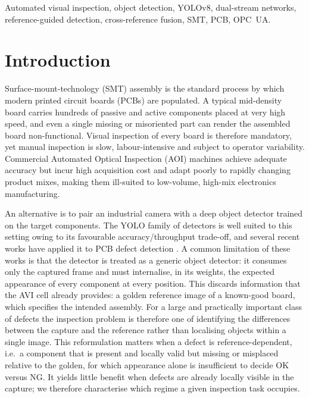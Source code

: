 \documentclass[conference]{IEEEtran}
\begin{document}
\begin{IEEEkeywords}
Automated visual inspection, object detection, YOLOv8, dual-stream
networks, reference-guided detection, cross-reference fusion, SMT,
PCB, OPC~UA.
\end{IEEEkeywords}

\section{Introduction}
\label{sec:intro}

Surface-mount-technology (SMT) assembly is the standard process by which
modern printed circuit boards (PCBs) are populated. A typical mid-density
board carries hundreds of passive and active components placed at very high
speed, and even a single missing or misoriented part can render the assembled
board non-functional. Visual inspection of every board is therefore mandatory,
yet manual inspection is slow, labour-intensive and subject to operator
variability. Commercial Automated Optical Inspection (AOI) machines achieve
adequate accuracy but incur high acquisition cost and adapt poorly to rapidly
changing product mixes, making them ill-suited to low-volume, high-mix
electronics manufacturing.

An alternative is to pair an industrial camera with a deep object detector
trained on the target components. The YOLO family of detectors
\cite{redmon2016yolo,jocher2023yolov8} is well suited to this setting owing to
its favourable accuracy/throughput trade-off, and several recent works have
applied it to PCB defect detection
\cite{xu2025yolo11solder,du2023yolombbi}.
A common limitation of these works is that the detector is treated as a generic
object detector: it consumes only the captured frame and must internalise, in
its weights, the expected appearance of every component at every position. This
discards information that the AVI cell already provides: a golden reference image
of a known-good board, which specifies the intended assembly. For a large and
practically important class of defects the inspection problem is therefore one of
identifying the differences between the capture and the reference rather than
localising objects within a single image. This reformulation matters when a defect
is reference-dependent, i.e.\ a component that is present and locally valid but
missing or misplaced relative to the golden, for which appearance alone is
insufficient to decide OK versus NG. It yields little benefit when defects are
already locally visible in the capture; we therefore characterise which regime a
given inspection task occupies.
\end{document}
